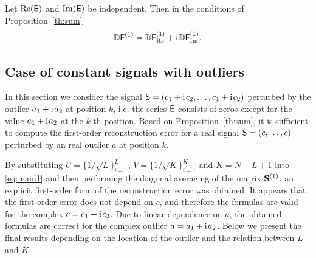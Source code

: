 \documentclass[engproc, submit, article,pdftex,moreauthors]{Definitions/mdpi}
\newcommand{\iu}{\mathrm{i}\mkern2mu}
\renewcommand{\Re}{\operatorname{Re}}
\renewcommand{\Im}{\operatorname{Im}}
\begin{document}
\begin{Corollary}
\label{cor:var}
Let $\Re(\tE)$ and $\Im(\tE)$ be independent. Then in the conditions of Proposition~\ref{th:sum}
$$\mathbb{D} \tF^{(1)} = \mathbb{D}\tF^{(1)}_{\Re} + \iu \mathbb{D}\tF^{(1)}_{\Im}.$$
\end{Corollary}

\subsection{Case of constant signals with outliers}
\label{sec:outlier}
In this section we consider the signal $\tS = (c_1 + \iu c_2, \ldots, c_1 + \iu c_2)$ perturbed by the outlier $a_1 + \iu a_2$ at position $k$, i.e. the series $\textsf{E}$ consists of zeros except for the value $a_1 + \iu a_2$ at the $k$-th position. Based on Proposition~\ref{th:sum}, it is sufficient to compute the first-order reconstruction error for a real signal $\textsf{S} = (c, \ldots, c)$ perturbed by an real outlier $a$ at position $k$.

By substituting $U = \{1/\sqrt{L}\}^{L}_{i = 1}$, $V = \{1/\sqrt{K}\}^{K}_{i = 1}$ and $K = N - L + 1$ into \eqref{eq:main1} and then performing the diagonal averaging of the matrix $\mathbf{S}^{(1)}$, an explicit first-order form of the reconstruction error was obtained. It appears that the first-order error does not depend on $c$, and therefore the formulas are valid for the complex $c=c_1 + \iu c_2$. Due to linear dependence on $a$, the obtained formulas are correct for the complex outlier $a=a_1 + \iu a_2$. Below we present the final results depending on the location of the outlier and the relation between $L$  and $K$.
\end{document}
